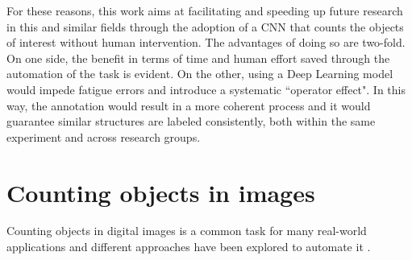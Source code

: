 For these reasons, this work aims at facilitating and speeding up future research in this and similar fields through the adoption of a CNN that counts the objects of interest without human intervention.
The advantages of doing so are two-fold. 
On one side, the benefit in terms of time and human effort saved through the automation of the task is evident.
On the other, using a Deep Learning model would impede fatigue errors and introduce a systematic ``operator effect".
In this way, the annotation would result in a more coherent process and it would guarantee similar structures are labeled consistently, both within the same experiment and across research groups.


\section{Counting objects in images}
\label{sec:counting_objs}

Counting objects in digital images is a common task for many real-world applications \cite{segui2015learning, arteta2016counting, paul2017countception, rahnemoonfar2017deepfruit} and different approaches have been explored to automate it \cite{lempitsky2010learning, ciresan2012deep, cirecsan2013mitosis, Kraus2016, Raza2017}. 

